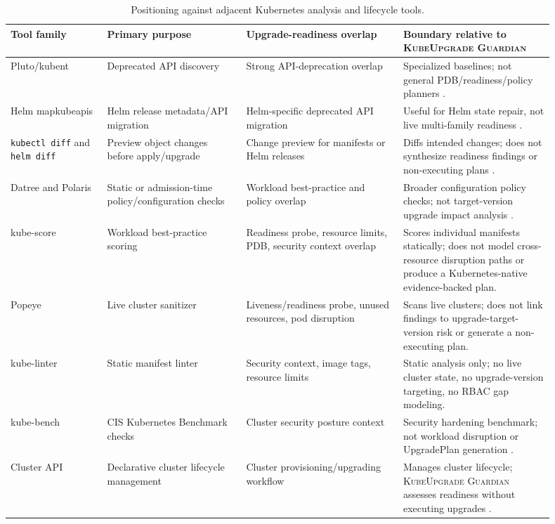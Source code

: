 \documentclass[10pt,journal]{IEEEtran}
\newcommand{\tool}{\textsc{KubeUpgrade Guardian}}
\newcommand{\code}[1]{\texttt{#1}}
\begin{document}
\begin{table}[t]
  \centering
  \caption{Positioning against adjacent Kubernetes analysis and lifecycle tools.}
  \label{tab:tool-positioning}
  \scriptsize
  \begin{tabular}{p{0.16\linewidth}p{0.23\linewidth}p{0.26\linewidth}p{0.25\linewidth}}
    \toprule
    Tool family & Primary purpose & Upgrade-readiness overlap & Boundary relative to \tool{} \\
    \midrule
    Pluto/kubent & Deprecated API discovery & Strong API-deprecation overlap & Specialized baselines; not general PDB/readiness/policy planners \cite{pluto,kubent}. \\
    Helm mapkubeapis & Helm release metadata/API migration & Helm-specific deprecated API migration & Useful for Helm state repair, not live multi-family readiness \cite{helmMapKubeApis}. \\
    \code{kubectl diff} and \code{helm diff} & Preview object changes before apply/upgrade & Change preview for manifests or Helm releases & Diffs intended changes; does not synthesize readiness findings or non-executing plans \cite{kubectlDiff,helmDiff}. \\
    Datree and Polaris & Static or admission-time policy/configuration checks & Workload best-practice and policy overlap & Broader configuration policy checks; not target-version upgrade impact analysis \cite{datree,polaris}. \\
    kube-score & Workload best-practice scoring & Readiness probe, resource limits, PDB, security context overlap & Scores individual manifests statically; does not model cross-resource disruption paths or produce a Kubernetes-native evidence-backed plan. \\
    Popeye & Live cluster sanitizer & Liveness/readiness probe, unused resources, pod disruption & Scans live clusters; does not link findings to upgrade-target-version risk or generate a non-executing plan. \\
    kube-linter & Static manifest linter & Security context, image tags, resource limits & Static analysis only; no live cluster state, no upgrade-version targeting, no RBAC gap modeling. \\
    kube-bench & CIS Kubernetes Benchmark checks & Cluster security posture context & Security hardening benchmark; not workload disruption or UpgradePlan generation \cite{kubeBench}. \\
    Cluster API & Declarative cluster lifecycle management & Cluster provisioning/upgrading workflow & Manages cluster lifecycle; \tool{} assesses readiness without executing upgrades \cite{clusterApi}. \\
    \bottomrule
  \end{tabular}
\end{table}
\end{document}
